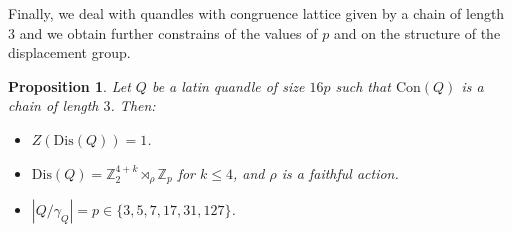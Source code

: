 \documentclass[a4paper, english, 9pt]{amsart}
\theoremstyle{plain}
\newtheorem{proposition}[theorem]{Proposition}
\theoremstyle{definition}
\def\dis{\mathrm{Dis}}
\def\con{\mathrm{Con}}
\def\comment#1{{\color{red} #1}}
\def\Z{\mathbb Z}
\def\LSS{\mathcal{LSS}}
\begin{document}
Finally, we deal with quandles with congruence lattice given by a chain of length $3$ and we obtain further constrains of the values of $p$ and on the structure of the displacement group.
\begin{proposition}\label{LSS 16p}
Let $Q$ be a latin quandle of size $16p$ such that $\con(Q)$ is a chain of length $3$. Then: 
\begin{itemize}
\item[(i)]  $Z(\dis(Q))=1$.

\item[(ii)] $\dis(Q)=\Z_2^{4+k}\rtimes_\rho \Z_p$ for $k\leq 4$, and $\rho$ is a faithful action.



\item[(iii)] $|Q/\gamma_Q|=p\in \{3,5,7,17,31,127\}$.







\end{itemize}


\end{proposition}


 
 




 
\end{document}
